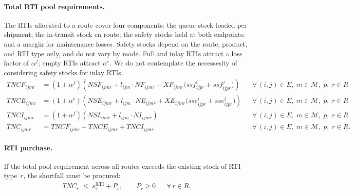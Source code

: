 \paragraph{Total RTI pool requirements.}
The RTIs allocated to a route cover four components: the queue
stock loaded per shipment; the in-transit stock en route; the
safety stocks held at both endpoints; and a margin for maintenance
losses. Safety stocks depend on the route, product, and RTI type
only, and do not vary by mode. Full and inlay RTIs attract a loss
factor of $\alpha^{f}$; empty RTIs attract $\alpha^{e}$. We do not contemplate the necessesity of considering safety stocks for inlay RTIs. 
%
\begin{align}
  TNCF_{ijmr}
  &= (1+\alpha^{f})\!\left(
       NSF_{ijmr}
       + l_{ijm}\cdot NF_{ijmr}
       + XF_{ijmr}\bigl(ssf^{i}_{ijpr}+ssf^{j}_{ijpr}\bigr)
     \right)
  && \forall\,(i,j)\in E,\;m\in\mathcal{M},\;p,\;r\in R
  \label{eq:pool-full}\\[4pt]
  TNCE_{ijmr}
  &= (1+\alpha^{e})\!\left(
       NSE_{ijmr}
       + l_{ijm}\cdot NE_{ijmr}
       + XE_{ijmr}\bigl(sse^{i}_{ijpr}+sse^{j}_{ijpr}\bigr)
     \right)
  && \forall\,(i,j)\in E,\;m\in\mathcal{M},\;p,\;r\in R
  \label{eq:pool-empty}\\[4pt]
  TNCI_{ijmr}
  &= (1+\alpha^{f})\!\left(
       NSI_{ijmr}
       + l_{ijm}\cdot NI_{ijmr}
     \right)
  && \forall\,(i,j)\in E,\;m\in\mathcal{M},\;p,\;r\in R
  \label{eq:pool-inlay}\\[4pt]
  TNC_{ijmr}
  &= TNCF_{ijmr}+TNCE_{ijmr}+TNCI_{ijmr}
  && \forall\,(i,j)\in E,\;m\in\mathcal{M},\;p,\;r\in R.
  \label{eq:pool-total}
\end{align}


\paragraph{RTI purchase.}
If the total pool requirement across all routes exceeds the
existing stock of RTI type~$r$, the shortfall must be procured:
%
\begin{align}
  \overline{TNC}_{r}
  \;\leq\; s^{\text{RTI}}_{r} + P_{r},
  \qquad P_{r}\geq 0
  && \forall\,r\in R.
  \label{eq:purchase}
\end{align}



